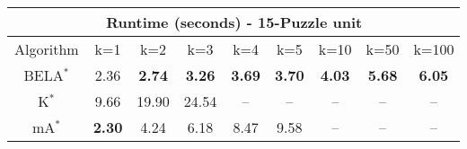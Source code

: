 \begin{tabular}{c|cccccccc}\toprule
\multicolumn{9}{c}{Runtime (seconds) - 15-Puzzle unit}\\ \midrule
Algorithm & k=1 & k=2 & k=3 & k=4 & k=5 & k=10 & k=50 & k=100 \\ \midrule
BELA$^*$ & 2.36 & \textbf{2.74} & \textbf{3.26} & \textbf{3.69} & \textbf{3.70} & \textbf{4.03} & \textbf{5.68} & \textbf{6.05} \\
K$^*$ & 9.66 & 19.90 & 24.54 & -- & -- & -- & -- & -- \\
mA$^*$ & \textbf{2.30} & 4.24 & 6.18 & 8.47 & 9.58 & -- & -- & -- \\ \bottomrule 
\end{tabular}
